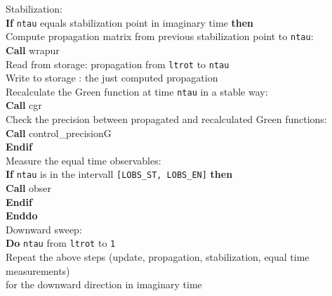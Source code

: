 \begin{mdframed}[frametitle={Structure of the main program \path{Prog/main.f90} of the auxiliary field QMC implementation:}]
{\hspace*{3em}  Stabilization: \\     
\hspace*{3em} \textbf{If} \texttt{ntau} equals stabilization point in imaginary time \textbf{then}\\
\hspace*{4em} Compute propagation matrix from previous stabilization point to \texttt{ntau}: \\
\hspace*{4em} \textbf{Call} wrapur\\
\hspace*{4em} Read from storage: propagation from \texttt{ltrot} to \texttt{ntau}\\
\hspace*{4em} Write to storage : the just computed propagation \\
\hspace*{4em} Recalculate the Green function at time \texttt{ntau} in a stable way:\\
\hspace*{4em} \textbf{Call} cgr\\            
\hspace*{4em} Check the precision between propagated and recalculated Green functions:\\
\hspace*{4em} \textbf{Call} control\_precisionG\\
\hspace*{3em} \textbf{Endif}\\
    
\hspace*{3em} Measure the equal time observables: \\
\hspace*{3em} \textbf{If} \texttt{ntau} is in the intervall \texttt{[LOBS\_ST, LOBS\_EN]} \textbf{then}\\
\hspace*{4em} \textbf{Call} obser\\
\hspace*{3em} \textbf{Endif}\\
\hspace*{2em} \textbf{Enddo}\\

\hspace*{2em} Downward sweep:\\
\hspace*{2em} \textbf{Do} \texttt{ntau} from \texttt{ltrot} to \texttt{1}\\
\hspace*{3em} Repeat the above steps (update, propagation, stabilization, equal time measurements) \\
\hspace*{3em} for the downward direction in imaginary time\\

}
\end{mdframed}
